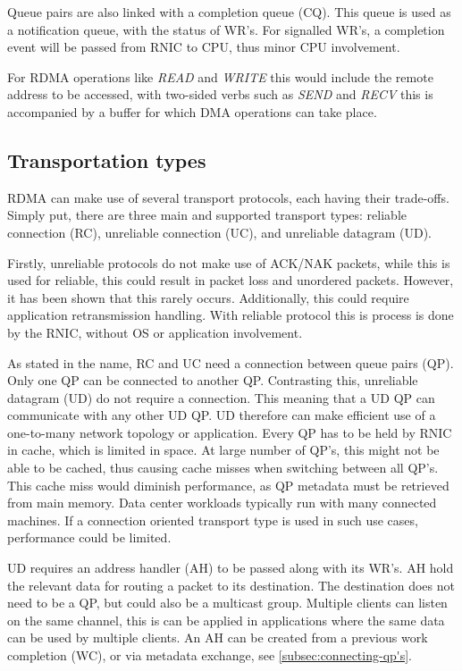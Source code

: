 Queue pairs are also linked with a completion queue (CQ).
This queue is used as a notification queue, with the status of WR's.
For signalled WR's, a completion event will be passed from RNIC to CPU, thus minor CPU involvement.


For RDMA operations like \textit{READ} and \textit{WRITE} this would include the remote address to be accessed, with two-sided verbs such as \textit{SEND} and \textit{RECV} this is accompanied by a buffer for which DMA operations can take place.

\subsection{Transportation types}\label{subsec:transportation-types}
RDMA can make use of several transport protocols, each having their trade-offs.
Simply put, there are three main and supported transport types: reliable connection (RC), unreliable connection (UC), and unreliable datagram (UD).

Firstly, unreliable protocols do not make use of ACK/NAK packets, while this is used for reliable, this could result in packet loss and unordered packets.
However, it has been shown that this rarely occurs\cite{kalia2014using, kalia2016fasst}.
Additionally, this could require application retransmission handling.
With reliable protocol this is process is done by the RNIC, without OS or application involvement.

As stated in the name, RC and UC need a connection between queue pairs (QP).
Only one QP can be connected to another QP.
Contrasting this, unreliable datagram (UD) do not require a connection.
This meaning that a UD QP can communicate with any other UD QP.
UD therefore can make efficient use of a one-to-many network topology or application.
Every QP has to be held by RNIC in cache, which is limited in space\cite{qiu2018toward}.
At large number of QP's, this might not be able to be cached, thus causing cache misses when switching between all QP's.
This cache miss would diminish performance, as QP metadata must be retrieved from main memory.
Data center workloads typically run with many connected machines\cite{vasudevan2009safe}.
If a connection oriented transport type is used in such use cases, performance could be limited\cite{kalia2016fasst}.

UD requires an address handler (AH) to be passed along with its WR's.
AH hold the relevant data for routing a packet to its destination.
The destination does not need to be a QP, but could also be a multicast group.
Multiple clients can listen on the same channel, this is can be applied in applications where the same data can be used by multiple clients.
An AH can be created from a previous work completion (WC), or via metadata exchange, see \ref{subsec:connecting-qp's}.

